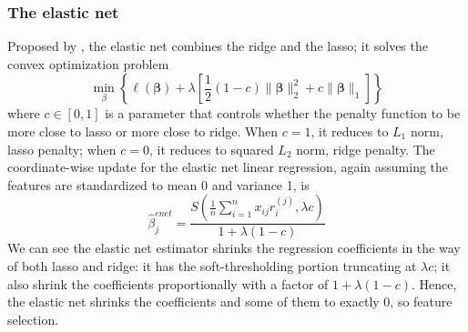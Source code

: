 \subsubsection{The elastic net}
Proposed by \cite{zou2005regularization}, the elastic net combines the ridge and the lasso; it solves the convex optimization problem
\begin{equation}
    \min_{\beta} \left\{ \ell(\bm{\beta})+\lambda\left[\frac{1}{2}(1-c)\|\bm{\beta}\|_2^2+c\|\bm{\beta}\|_1\right] \label{eq1.10} \right\} 
\end{equation}
where $c\in [0,1]$ is a parameter that controls whether the penalty function to be more close to lasso or more close to ridge. When $c=1$, it reduces to $L_1$ norm, lasso penalty; when $c=0$, it reduces to squared $L_2$ norm, ridge penalty. The coordinate-wise update for the elastic net linear regression, again assuming the features are standardized to mean 0 and variance 1, is 
\begin{equation}
    \hat{\beta}_j^{enet} = \frac{S(\frac{1}{n}\sum_{i=1}^{n}x_{ij}r_i^{(j)}, \lambda c)}{1+\lambda(1-c)} \label{eq1.11}
\end{equation}
We can see the elastic net estimator shrinks the regression coefficients in the way of both lasso and ridge: it has the soft-thresholding portion truncating at $\lambda c$; it also shrink the coefficients proportionally with a factor of $1+\lambda(1-c)$. Hence, the elastic net shrinks the coefficients and some of them to exactly 0, so feature selection.

